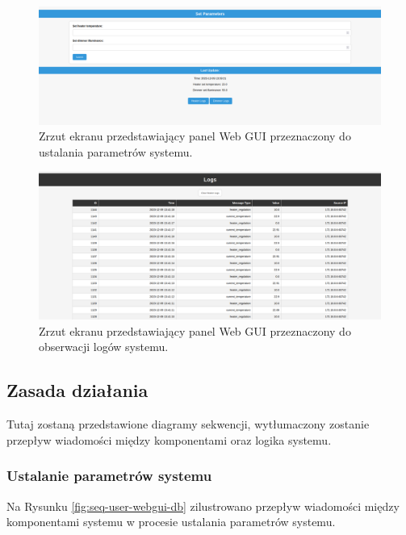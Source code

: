             \begin{figure}[H]
                \centering
                \includegraphics[width=0.8\linewidth]{graphics/screenshots/web-gui-set-parameters.png}
                \caption{Zrzut ekranu przedstawiający panel Web GUI przeznaczony do ustalania parametrów systemu.}
                \label{fig:web-gui-set-parameters}
            \end{figure}

            \begin{figure}[H]
                \centering
                \includegraphics[width=0.8\linewidth]{graphics/screenshots/web-gui-logs.png}
                \caption{Zrzut ekranu przedstawiający panel Web GUI przeznaczony do obserwacji logów systemu.}
                \label{fig:web-gui-logs}
            \end{figure}

    \subsection{Zasada działania}

    Tutaj zostaną przedstawione diagramy sekwencji, wytłumaczony zostanie przepływ wiadomości między komponentami oraz logika systemu.

        \subsubsection{Ustalanie parametrów systemu}

            Na Rysunku \ref{fig:seq-user-webgui-db} zilustrowano przepływ wiadomości między komponentami systemu w procesie ustalania parametrów systemu.

